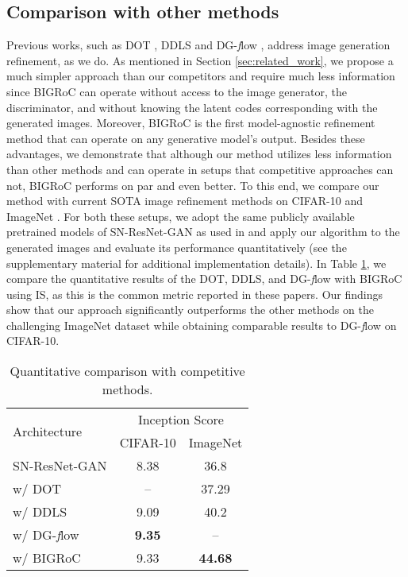 \documentclass[10pt]{article} \usepackage[accepted]{tmlr}
\begin{document}
\subsection{Comparison with other methods}
\label{sec:comp_methods}
Previous works, such as DOT \citep{tanaka2019discriminator}, DDLS \citep{che2021gan} and DG-\textit{f}low \citep{ansari2021refining}, address image generation refinement, as we do. As mentioned in Section \ref{sec:related_work}, we propose a much simpler approach than our competitors and require much less information since BIGRoC can operate without access to the image generator, the discriminator, and without knowing the latent codes corresponding with the generated images.
Moreover, BIGRoC is the first model-agnostic refinement method that can operate on any generative model's output.
Besides these advantages, we demonstrate that although our method utilizes less information than other methods and can operate in setups that competitive approaches can not, BIGRoC performs on par and even better. 
To this end, we compare our method with current SOTA image refinement methods on CIFAR-10 and ImageNet .
For both these setups, we adopt the same publicly available pretrained models of SN-ResNet-GAN as used in \citep{tanaka2019discriminator, che2021gan, ansari2021refining} and apply our algorithm to the generated images and evaluate its performance quantitatively (see the supplementary material for additional implementation details). 
In Table \ref{tab:comp_results}, we compare the quantitative results of the DOT, DDLS, and DG-\textit{f}low with BIGRoC using IS, as this is the common metric reported in these papers. Our findings show that our approach significantly outperforms the other methods on the challenging ImageNet dataset while obtaining comparable results to DG-\textit{f}low on CIFAR-10.

\begin{table}[h]
\caption{Quantitative comparison with competitive methods.}
\begin{center}
\begin{small}
\begin{sc}
\begin{tabular}{l|cc}
\toprule
\multirow{2}{*}{Architecture} & \multicolumn{2}{c}{Inception Score } \\
& CIFAR-10 & ImageNet\\
\midrule
\rowcolor{LightGray}SN-ResNet-GAN & 8.38 & 36.8\\
w/ DOT & -- & 37.29 \\
w/ DDLS & 9.09 & 40.2\\
w/ DG-\textit{f}low & \textbf{9.35} & -- \\
w/ BIGRoC & 9.33 & \textbf{44.68}\\
\bottomrule
\end{tabular}
\end{sc}
\end{small}
\end{center}
\label{tab:comp_results}
\end{table}
\end{document}

